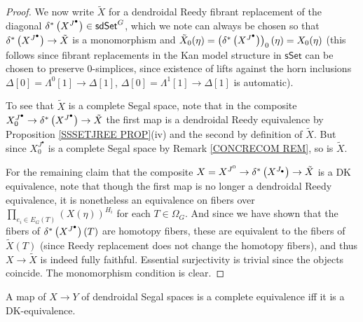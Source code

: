 \documentclass[a4paper,10pt
,draft
]{article}%
\begin{document}
\begin{proof}
We now write $\tilde{X}$ for a dendroidal Reedy fibrant replacement of the diagonal 
$\delta^{\**} \left(X^{J^{\bullet}}\right) \in \mathsf{sdSet}^G$,
which we note can always be chosen so that
$\delta^{\**} \left(X^{J^{\bullet}}\right) \to \tilde{X}$
is a monomorphism and
$\tilde{X}_0(\eta) = 
\left(\delta^{\**} \left(X^{J^{\bullet}}\right)\right)_0(\eta)=
X_0(\eta)$ (this follows since fibrant replacements in the Kan model structure in $\mathsf{sSet}$ can be chosen to preserve $0$-simplices, since existence of lifts against the horn inclusions
$\Delta[0]=\Lambda^0[1]\to \Delta[1]$,
$\Delta[0]=\Lambda^1[1]\to \Delta[1]$
is automatic).

To see that $\tilde{X}$ is a complete Segal space, note that in the composite
$X_0^{J^{\bullet}} \to
\delta^{\**}\left( X^{J^{\bullet}} \right)
\to \tilde{X}$
the first map is a dendroidal Reedy equivalence by Proposition \ref{SSSETJREE PROP}(iv) and the second by definition of $\tilde{X}$.
But since $X_0^{J^{\bullet}}$ is a complete Segal space by Remark \ref{CONCRECOM REM}, so is $\tilde{X}$.

For the remaining claim that the composite
$X = X^{J^{0}} \to 
\delta^{\**}\left( X^{J_{\bullet}} \right)
\to \tilde{X}$
is a DK equivalence, 
note that though
the first map is no longer a dendroidal Reedy equivalence, 
it is nonetheless an equivalence
on fibers over
$\prod_{e_i \in E_G(T)} \left(X(\eta)\right)^{H_i}$
for each $T\in \Omega_G$.
And since we have shown that the fibers of
$\delta^{\**}\left( X^{J^{\bullet}} \right)(T)$
 are homotopy fibers, these are equivalent to the fibers of $\tilde{X}(T)$ (since Reedy replacement does not change the homotopy fibers), and thus $X \to \tilde{X}$ is indeed fully faithful.
Essential surjectivity is trivial since the objects coincide.
The monomorphism condition is clear.
\end{proof}


\begin{theorem}\label{COMPIFFDK THM}
	A map of $X \to Y$ of dendroidal Segal spaces is a complete equivalence iff it is a DK-equivalence.
\end{theorem}
\end{document}
